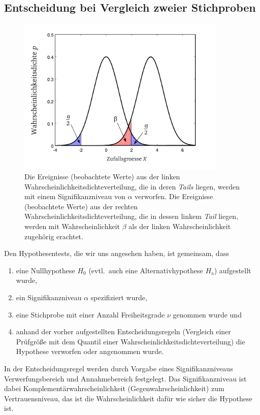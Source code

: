 \subsection{Entscheidung bei Vergleich zweier Stichproben}
\begin{figure}
\begin{center}
\includegraphics[width=100mm]{05_vorlesung/media/entscheidungsfehlertypen.pdf}
\caption{\label{entscheidungsfehler} Die Ereignisse (beobachtete Werte) aus der linken Wahrscheinlichkeitsdichteverteilung,
 die in deren \textsl{Tails} liegen, werden mit einem Signifikanzniveau von $\alpha$ verworfen.
 Die Ereignisse (beobachtete Werte) aus der rechten Wahrscheinlichkeitsdichteverteilung, die in dessen linkem
 \textsl{Tail} liegen, werden mit Wahrscheinlichkeit $\beta$ als der linken Wahrscheinlichkeit zugehörig
 erachtet.}
\end{center}
\end{figure}
Den Hypothesentests, die wir uns angesehen haben, ist gemeinsam, dass
\begin{enumerate}
\item eine Nullhypothese $H_0$ (evtl.\ auch eine Alternativhypothese $H_\mathrm{a}$)
aufgestellt wurde,
\item ein Signifikanzniveau $\alpha$ spezifiziert wurde,
\item eine Stichprobe mit einer Anzahl Freiheitsgrade $\nu$
genommen wurde und
\item anhand der vorher aufgestellten Entscheidungsregeln (Vergleich einer
Prüfgröße mit dem Quantil einer Wahrscheinlichkeitsdichteverteilung)
die Hypothese verworfen oder angenommen wurde.
\end{enumerate}
In der Entscheidungsregel werden durch Vorgabe eines Signifikanzniveaus Verwerfungsbereich
und Annahmebereich festgelegt. Das Signifikanzniveau ist dabei Komplementärwahrscheinlichkeit
(Gegenwahrscheinlichkeit) zum Vertrauensniveau, das ist die Wahrscheinlichkeit dafür
wie sicher die Hypothese ist.

